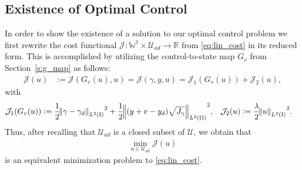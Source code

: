 \documentclass[final]{siamltex}
\begin{document}
\subsection{Existence of Optimal Control}
\label{s:oc_rc_existence}
In order to show the existence of a solution to our optimal control problem we
first rewrite
the cost functional ${\mathcal{J}}: {\mathbb{W}}^1 \times{{\mathcal{U}_{ad}}}\to{\mathbb{R}}$ 
from \eqref{eq:lin_cost} in its reduced form. This is accomplished by utilizing the control-to-state map
$G_v$ from Section~\ref{s:g_map} as follows:
	\begin{align*}
		{\mathcal{J}}(u) &:= {\mathcal{J}}(G_v(u),u) = {\mathcal{J}}(\gamma,y,u) = {\mathcal{J}}_1(G_v(u)) + {\mathcal{J}}_2(u),
	\end{align*}
	with
	\begin{align*}
		{\mathcal{J}}_1(G_v(u)) &:= \frac{1}{2}{\norm{{\gamma-\gamma_d}}_{{L^2\del{{{\text{\rm I}}}}}}}^2 
	        + \frac{1}{2}{\norm{{(y+v-y_d)\sqrt{J_\gamma}}}_{{L^2\del{{\Omega}}}}}^2, 
		& {\mathcal{J}}_2(u) &:= \frac{\lambda}{2}{\norm{{u}}_{{L^2\del{{{\text{\rm I}}}}}}}^2 .
	\end{align*}
Thus, after recalling that ${{\mathcal{U}_{ad}}}$ is a closed subset of ${\mathcal{U}}$, we obtain that
	\begin{align}\label{eq:lin_cost_reduced}
		\min_{u \in {{\mathcal{U}_{ad}}}} {\mathcal{J}}(u)
	\end{align}
is an equivalent minimization problem to \eqref{eq:lin_cost}.
\end{document}
